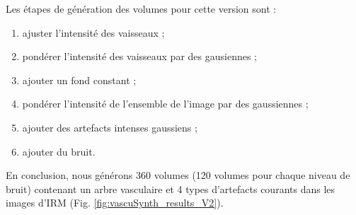 Les étapes de génération des volumes pour cette version sont :
\begin{enumerate}
  \item ajuster l'intensité des vaisseaux ;
  \item pondérer l'intensité des vaisseaux par des gausiennes ;
  \item ajouter un fond constant ; 
  \item pondérer l'intensité de l'ensemble de l'image par des gaussiennes ;
  \item ajouter des artefacts intenses gaussiens ;
  \item ajouter du bruit.
  \end{enumerate}
En conclusion, nous générons 360 volumes (120 volumes pour chaque niveau de bruit) contenant un arbre vasculaire et 4 types d'artefacts courants dans les images d'IRM (Fig. \ref{fig:vascuSynth_results_V2}).

